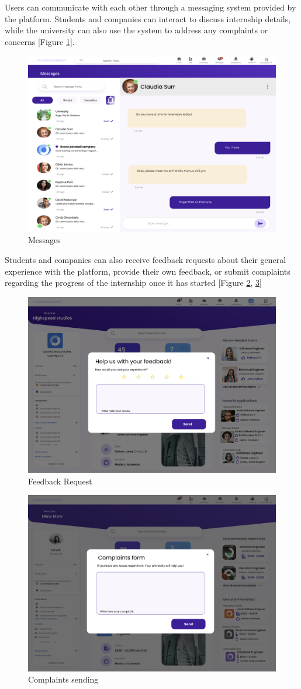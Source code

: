 Users can communicate with each other through a messaging system provided by the platform. Students and companies can interact to discuss internship details, while the university can also use the system to address any complaints or concerns [Figure \ref{fig: Messages}].


\begin{figure} [H]
    \centering
    \includegraphics[width=0.5\linewidth]{Images/Interface Images/user interface/Screenshot 2024-12-12 045915.png}
    \caption{Messages}
    \label{fig: Messages}
\end{figure}


Students and companies can also receive feedback requests about their general experience with the platform, provide their own feedback, or submit complaints regarding the progress of the internship once it has started [Figure \ref{fig:Feedback Request}, \ref{fig: Complaints sending}] 

\begin{figure} [H]
    \centering
    \includegraphics[width=0.5\linewidth]{Images/Interface Images/user interface/Screenshot 2024-12-12 045929.png}
    \caption{Feedback Request}
    \label{fig:Feedback Request}
\end{figure}

\begin{figure} [H]
    \centering
    \includegraphics[width=0.5\linewidth]{Images/Interface Images/user interface/Screenshot 2024-12-12 045947.png}
    \caption{Complaints sending}
    \label{fig: Complaints sending}
\end{figure}